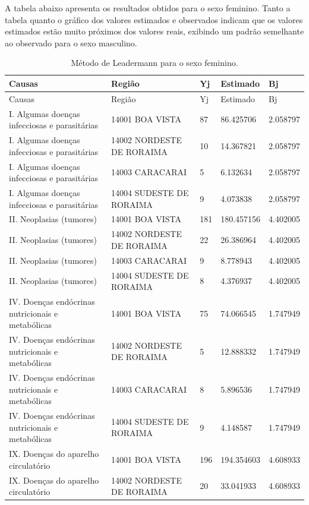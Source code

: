 \documentclass[
  12pt,
  a4paper,
]{scrreprt}
\begin{document}
A tabela abaixo apresenta os resultados obtidos para o sexo feminino.
Tanto a tabela quanto o gráfico dos valores estimados e observados
indicam que os valores estimados estão muito próximos dos valores reais,
exibindo um padrão semelhante ao observado para o sexo masculino.

\begin{longtable}[]{@{}lllll@{}}
\caption{Método de Leadermann para o sexo
feminino.}\label{T_72f97}\tabularnewline
\toprule\noalign{}
Causas & Região & Yj & Estimado & Bj \\
\midrule\noalign{}
\endfirsthead
\toprule\noalign{}
Causas & Região & Yj & Estimado & Bj \\
\midrule\noalign{}
\endhead
\bottomrule\noalign{}
\endlastfoot
I. Algumas doenças infecciosas e parasitárias & 14001 BOA VISTA & 87 &
86.425706 & 2.058797 \\
I. Algumas doenças infecciosas e parasitárias & 14002 NORDESTE DE
RORAIMA & 10 & 14.367821 & 2.058797 \\
I. Algumas doenças infecciosas e parasitárias & 14003 CARACARAI & 5 &
6.132634 & 2.058797 \\
I. Algumas doenças infecciosas e parasitárias & 14004 SUDESTE DE RORAIMA
& 9 & 4.073838 & 2.058797 \\
II. Neoplasias (tumores) & 14001 BOA VISTA & 181 & 180.457156 &
4.402005 \\
II. Neoplasias (tumores) & 14002 NORDESTE DE RORAIMA & 22 & 26.386964 &
4.402005 \\
II. Neoplasias (tumores) & 14003 CARACARAI & 9 & 8.778943 & 4.402005 \\
II. Neoplasias (tumores) & 14004 SUDESTE DE RORAIMA & 8 & 4.376937 &
4.402005 \\
IV. Doenças endócrinas nutricionais e metabólicas & 14001 BOA VISTA & 75
& 74.066545 & 1.747949 \\
IV. Doenças endócrinas nutricionais e metabólicas & 14002 NORDESTE DE
RORAIMA & 5 & 12.888332 & 1.747949 \\
IV. Doenças endócrinas nutricionais e metabólicas & 14003 CARACARAI & 8
& 5.896536 & 1.747949 \\
IV. Doenças endócrinas nutricionais e metabólicas & 14004 SUDESTE DE
RORAIMA & 9 & 4.148587 & 1.747949 \\
IX. Doenças do aparelho circulatório & 14001 BOA VISTA & 196 &
194.354603 & 4.608933 \\
IX. Doenças do aparelho circulatório & 14002 NORDESTE DE RORAIMA & 20 &
33.041933 & 4.608933 \\

\end{longtable}
\end{document}
